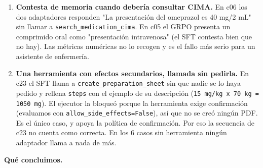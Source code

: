 \begin{enumerate}
  de tokens (por la longitud del texto); el resto termina sin cerrar. Con la puntuación
  estricta esa respuesta cuenta como vacía. Afecta a c23 con el GRPO: contesta bien ("1 mL")
  pero dentro del bloque. Contando ese caso, el GRPO con herramientas tendría 11 de 15, igual
  que el SFT. c10 es un error real (1,7). Así, la diferencia entre "sin herramientas" (12) y
  "con herramientas" (10 y 11) se explica sobre todo por el formato y no por las herramientas.
  No cambiamos la puntuación (el banco está congelado) y lo dejamos anotado.
\item
  \textbf{Contesta de memoria cuando debería consultar CIMA.} En c06 los dos adaptadores responden
  "La presentación del omeprazol es 40 mg/2 mL" sin llamar a \texttt{search\_\allowbreak{}medication\_\allowbreak{}cima}. En c05 el
  GRPO presenta un comprimido oral como "presentación intravenosa" (el SFT contesta bien que no
  hay). Las métricas numéricas no lo recogen y es el fallo más serio para un asistente de
  enfermería.
\item
  \textbf{Una herramienta con efectos secundarios, llamada sin pedirla.} En c23 el SFT llama a
  \texttt{create\_\allowbreak{}preparation\_\allowbreak{}sheet} sin que nadie se lo haya pedido y rellena \texttt{steps} con el ejemplo de
  su descripción (\texttt{15 mg/\allowbreak{}kg x 70 kg =\allowbreak{} 1050 mg}). El ejecutor la bloqueó porque la herramienta
  exige confirmación (evaluamos con \texttt{allow\_\allowbreak{}side\_\allowbreak{}effects=\allowbreak{}False}), así que no se creó ningún PDF.
  Es el único caso, y apoya la política de confirmación. Por eso la secuencia de c23 no cuenta
  como correcta. En los 6 casos sin herramienta ningún adaptador llama a nada de más.
\end{enumerate}

\textbf{Qué concluimos.}

